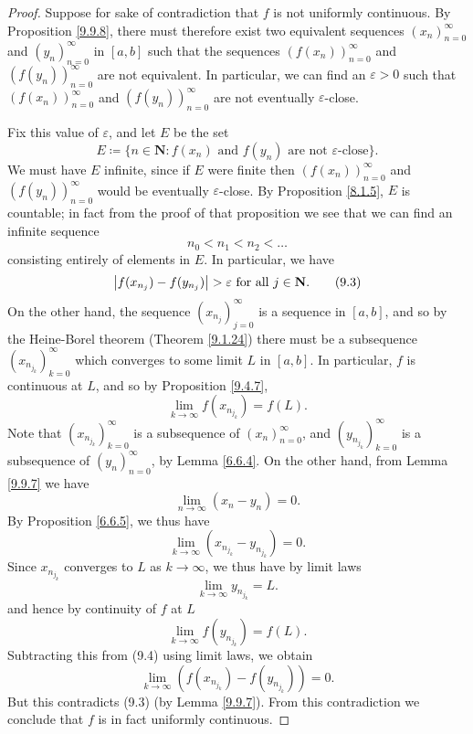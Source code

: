 \begin{proof}
    Suppose for sake of contradiction that \(f\) is not uniformly continuous.
    By Proposition \ref{9.9.8}, there must therefore exist two equivalent sequences \((x_n)_{n = 0}^\infty\) and \((y_n)_{n = 0}^\infty\) in \([a, b]\) such that the sequences \((f(x_n))_{n = 0}^\infty\) and \((f(y_n))_{n = 0}^\infty\) are not equivalent.
    In particular, we can find an \(\varepsilon > 0\) such that \((f(x_n))_{n = 0}^\infty\) and \((f(y_n))_{n = 0}^\infty\) are not eventually \(\varepsilon\)-close.

    Fix this value of \(\varepsilon\), and let \(E\) be the set
    \[
        E \coloneqq \{n \in \mathbf{N} : f(x_n) \text{ and } f(y_n) \text{ are not \(\varepsilon\)-close}\}.
    \]
    We must have \(E\) infinite, since if \(E\) were finite then \((f(x_n))_{n = 0}^\infty\) and \((f(y_n))_{n = 0}^\infty\) would be eventually \(\varepsilon\)-close.
    By Proposition \ref{8.1.5}, \(E\) is countable;
    in fact from the proof of that proposition we see that we can find an infinite sequence
    \[
        n_0 < n_1 < n_2 < \dots
    \]
    consisting entirely of elements in \(E\).
    In particular, we have
    \[
        \abs*{f(x_{n_j}) - f(y_{n_j})} > \varepsilon \text{ for all } j \in \mathbf{N}. \tag{9.3}\label{eq 9.3}
    \]
    On the other hand, the sequence \((x_{n_j})_{j = 0}^\infty\) is a sequence in \([a, b]\), and so by the Heine-Borel theorem (Theorem \ref{9.1.24}) there must be a subsequence \((x_{n_{j_k}})_{k = 0}^\infty\) which converges to some limit \(L\) in \([a, b]\).
    In particular, \(f\) is continuous at \(L\), and so by Proposition \ref{9.4.7},
    \[
        \lim_{k \to \infty} f(x_{n_{j_k}}) = f(L). \tag{9.4}\label{eq 9.4}
    \]
    Note that \((x_{n_{j_k}})_{k = 0}^\infty\) is a subsequence of \((x_n)_{n = 0}^\infty\), and \((y_{n_{j_k}})_{k = 0}^\infty\) is a subsequence of \((y_n)_{n = 0}^\infty\), by Lemma \ref{6.6.4}.
    On the other hand, from Lemma \ref{9.9.7} we have
    \[
        \lim_{n \to \infty} (x_n - y_n) = 0.
    \]
    By Proposition \ref{6.6.5}, we thus have
    \[
        \lim_{k \to \infty} (x_{n_{j_k}} - y_{n_{j_k}}) = 0.
    \]
    Since \(x_{n_{j_k}}\) converges to \(L\) as \(k \to \infty\), we thus have by limit laws
    \[
        \lim_{k \to \infty} y_{n_{j_k}} = L.
    \]
    and hence by continuity of \(f\) at \(L\)
    \[
        \lim_{k \to \infty} f(y_{n_{j_k}}) = f(L).
    \]
    Subtracting this from (9.4) using limit laws, we obtain
    \[
        \lim_{k \to \infty} (f(x_{n_{j_k}}) - f(y_{n_{j_k}})) = 0.
    \]
    But this contradicts (9.3) (by Lemma \ref{9.9.7}).
    From this contradiction we conclude that \(f\) is in fact uniformly continuous.
\end{proof}

